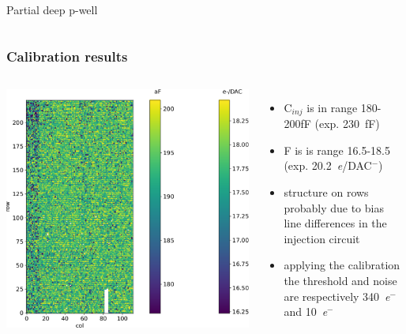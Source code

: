 \begin{frame}
\begin{columns}
                \centering Partial deep p-well
        \end{columns}
    \end{frame}


    \begin{frame}
        \frametitle{Calibration results}
        \begin{columns}
            \includegraphics[width=1.1\linewidth]{figures/charaterization/conversion_factor_map.pdf}
            \begin{itemize}
                \item C$_{inj}$ is in range 180-200\si{fF} (exp. \SI{230}{fF})
                \item F is is range 16.5-18.5 (exp. \SI{20.2}{\elementarycharge/DAC}$^-$)
                \item structure on rows probably due to bias line differences in the injection circuit 
                \item applying the calibration the threshold and noise are respectively \SI{340}{\elementarycharge}$^-$ and \SI{10}{\elementarycharge}$^-$
            \end{itemize}
        \end{columns}
    \end{frame}


